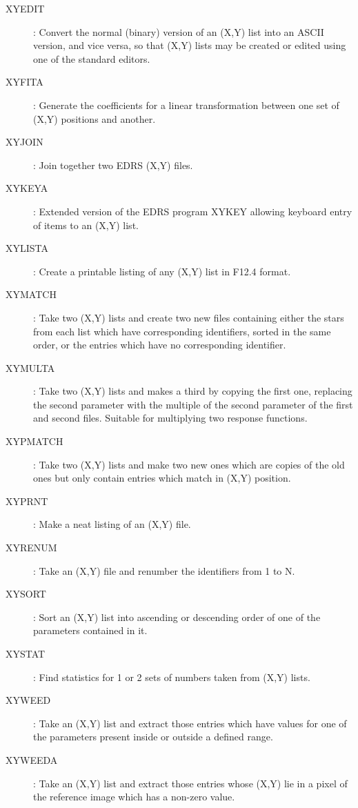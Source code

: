 \begin{description}
\item [XYEDIT]: Convert the normal (binary) version of an (X,Y) list into an
ASCII version, and vice versa, so that (X,Y) lists may be created or edited
using one of the standard editors.
\item [XYFITA]: Generate the coefficients for a linear transformation between
one set of (X,Y) positions and another.
\item [XYJOIN]: Join together two EDRS (X,Y) files.
\item [XYKEYA]: Extended version of the EDRS program XYKEY allowing keyboard
entry of items to an (X,Y) list.
\item [XYLISTA]: Create a printable listing of any (X,Y) list in F12.4 format.
\item [XYMATCH]: Take two (X,Y) lists and create two new files containing
either the stars from each list which have corresponding identifiers, sorted
in the same order, or the entries which have no corresponding identifier.
\item [XYMULTA]: Take two (X,Y) lists and makes a third by copying the first
one, replacing the second parameter with the multiple of the second parameter
of the first and second files.
Suitable for multiplying two response functions.
\item [XYPMATCH]: Take two (X,Y) lists and make two new ones which are copies
of the old ones but only contain entries which match in (X,Y) position.
\item [XYPRNT]: Make a neat listing of an (X,Y) file.
\item [XYRENUM]: Take an (X,Y) file and renumber the identifiers from 1 to N.
\item [XYSORT]: Sort an (X,Y) list into ascending or descending order of one of
the parameters contained in it.
\item [XYSTAT]: Find statistics for 1 or 2 sets of numbers taken from (X,Y)
lists.
\item [XYWEED]: Take an (X,Y) list and extract those entries which have values
for one of the parameters present inside or outside a defined range.
\item [XYWEEDA]: Take an (X,Y) list and extract those entries whose (X,Y) lie
in a pixel of the reference image which has a non-zero value.
\end{description}
